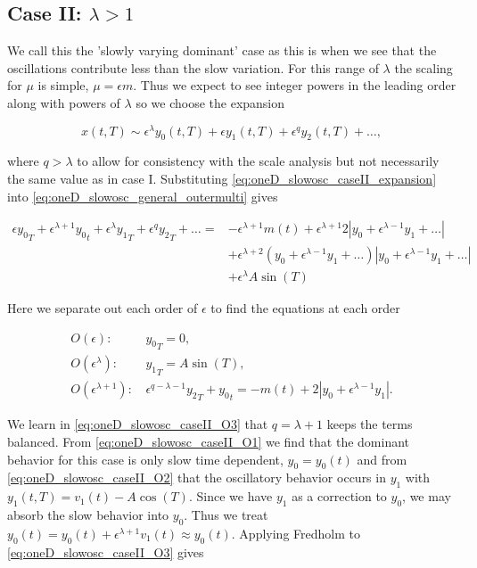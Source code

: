 \subsection{Case II: $\lambda>1$}
\label{subsec:oneD_slowosc_caseII}

We call this the 'slowly varying dominant' case as this is when we see that the oscillations contribute less than the slow variation. For this range of $\lambda$ the scaling for $\mu$ is simple, $\mu=\epsilon m$. Thus we expect to see integer powers in the leading order along with powers of $\lambda$ so we choose the expansion

\begin{equation}\label{eq:oneD_slowosc_caseII_expansion}
x(t,T) \sim \epsilon^\lambda y_0(t,T)+\epsilon y_1(t,T)+\epsilon^q y_2(t,T)+\ldots,
\end{equation}


where $q>\lambda$ to allow for consistency with the scale analysis but not necessarily the same value as in case I. Substituting \eqref{eq:oneD_slowosc_caseII_expansion} into \eqref{eq:oneD_slowosc_general_outermulti} gives

\begin{equation*}
\begin{aligned}
\epsilon {y_0}_T+\epsilon^{\lambda+1} {y_0}_t+\epsilon^\lambda {y_1}_T+\epsilon^q {y_2}_T+\ldots=&-\epsilon^{\lambda+1}m(t)+\epsilon^{\lambda+1} 2|y_0+\epsilon^{\lambda-1} y_1 +\ldots|\\
&+ \epsilon^{\lambda+2}( y_0+\epsilon^{\lambda-1} y_1 +\ldots)| y_0+\epsilon^{\lambda-1} y_1 +\ldots|\\
&+\epsilon^\lambda A\sin(T) 
\end{aligned}
\end{equation*}

Here we separate out each order of $\epsilon$ to find the equations at each order

\begin{align} \label{eq:oneD_slowosc_caseII_O1}
O(\epsilon): &\, {y_0}_T=0,\\ \label{eq:oneD_slowosc_caseII_O2}
O(\epsilon^\lambda):  &\, {y_1}_T = A\sin(T),\\ \label{eq:oneD_slowosc_caseII_O3}
O(\epsilon^{\lambda+1}): &\, \epsilon^{q-\lambda-1}{y_2}_T+ {y_0}_t = -m(t) +2|y_0+\epsilon^{\lambda-1}y_1|.
\end{align}

We learn in \eqref{eq:oneD_slowosc_caseII_O3} that $q=\lambda+1$ keeps the terms balanced. From \eqref{eq:oneD_slowosc_caseII_O1} we find that the dominant behavior for this case is only slow time dependent, $y_0=y_0(t)$ and from \eqref{eq:oneD_slowosc_caseII_O2} that the oscillatory behavior occurs in $y_1$ with $y_1(t,T)=v_1(t)-A\cos(T)$. Since we have $y_1$ as a correction to $y_0$, we may absorb the slow behavior into $y_0$. Thus we treat $y_0(t)=y_0(t)+\epsilon^{\lambda+1} v_1(t)\approx y_0(t)$. Applying Fredholm to \eqref{eq:oneD_slowosc_caseII_O3} gives 

